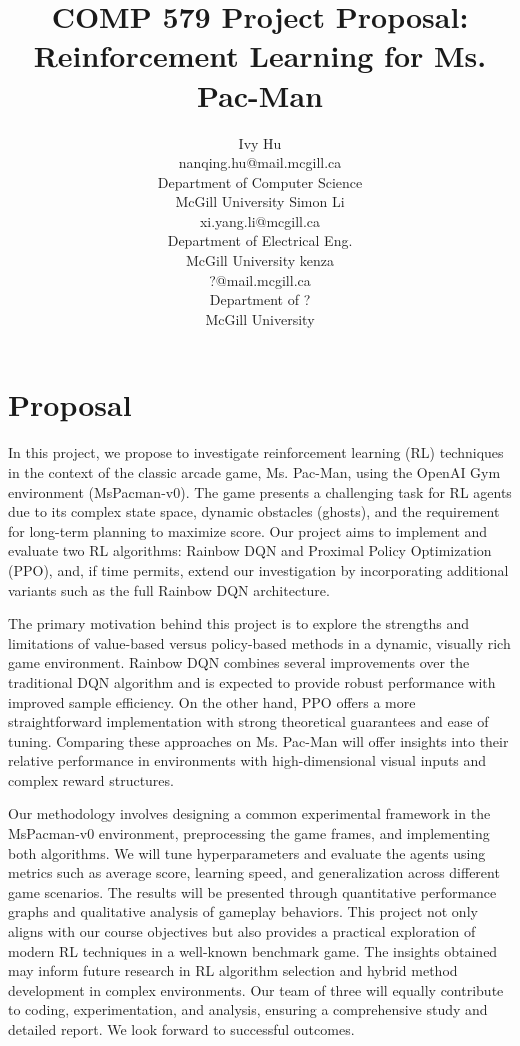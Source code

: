 \documentclass{article}
\title{COMP 579 Project Proposal: Reinforcement Learning for Ms. Pac-Man}
\author{
  Ivy Hu \\
  nanqing.hu@mail.mcgill.ca \\
  Department of Computer Science\\
  McGill University
  \And
  Simon Li \\
  xi.yang.li@mcgill.ca\\
  Department of Electrical Eng.\\
  McGill University
  \And
  kenza \\
  ?@mail.mcgill.ca\\
  Department of ?\\
  McGill University
}
\begin{document}
\maketitle

\section{Proposal}
In this project, we propose to investigate reinforcement learning (RL) techniques in the context of the classic arcade game, Ms. Pac-Man, using the OpenAI Gym environment (MsPacman-v0). The game presents a challenging task for RL agents due to its complex state space, dynamic obstacles (ghosts), and the requirement for long-term planning to maximize score. Our project aims to implement and evaluate two RL algorithms: Rainbow DQN and Proximal Policy Optimization (PPO), and, if time permits, extend our investigation by incorporating additional variants such as the full Rainbow DQN architecture.

The primary motivation behind this project is to explore the strengths and limitations of value-based versus policy-based methods in a dynamic, visually rich game environment. Rainbow DQN combines several improvements over the traditional DQN algorithm and is expected to provide robust performance with improved sample efficiency. On the other hand, PPO offers a more straightforward implementation with strong theoretical guarantees and ease of tuning. Comparing these approaches on Ms. Pac-Man will offer insights into their relative performance in environments with high-dimensional visual inputs and complex reward structures.

Our methodology involves designing a common experimental framework in the MsPacman-v0 environment, preprocessing the game frames, and implementing both algorithms. We will tune hyperparameters and evaluate the agents using metrics such as average score, learning speed, and generalization across different game scenarios. The results will be presented through quantitative performance graphs and qualitative analysis of gameplay behaviors. This project not only aligns with our course objectives but also provides a practical exploration of modern RL techniques in a well-known benchmark game. The insights obtained may inform future research in RL algorithm selection and hybrid method development in complex environments. Our team of three will equally contribute to coding, experimentation, and analysis, ensuring a comprehensive study and detailed report. We look forward to successful outcomes.
\end{document}
